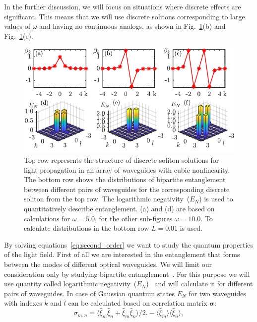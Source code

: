 \documentclass[9pt,twocolumn,twoside]{osajnl}
\begin{document}
In the further discussion, we will focus on situations where discrete effects are significant. 
This means that we will use discrete solitons corresponding to large values of $\omega$ and having no continuous analogs, as shown in Fig.~\ref{fig:structure}(b) and Fig.~\ref{fig:structure}(c).
\par
\begin{figure}[h!]
	\centering\includegraphics{fig2}
	\caption{Top row represents the structure of discrete soliton solutions for light propagation in an array of waveguides with cubic nonlinearity. The bottom row shows the distributions of bipartite entanglement between different pairs of waveguides for the corresponding discrete soliton from the top row. The logarithmic negativity~($E_N$) is used to quantitatively describe entanglement. (a) and (d) are based on calculations for $\omega = 5.0$, for the other sub-figures $\omega = 10.0$. To calculate distributions in the bottom row $L=0.01$ is used.}
	\label{fig:structure}
\end{figure}
By solving equations~\eqref{eq:second_order} we want to study the quantum properties of the light field.
First of all we are interested in the entanglement that forms between the modes of different optical waveguides.
We will limit our consideration only by studying bipartite entanglement~\cite{gebremariam_tesfahannes_generation_2020, tura_detecting_2014}.
For this purpose we will use quantity called logarithmic negativity~($E_N$)~\cite{vidal_computable_2002} and will calculate it for different pairs of waveguides. 
In case of Gaussian quantum states $E_N$ for two waveguides with indexes $k$ and $l$ can be calculated based on correlation matrix $\bm{\sigma}$:
\begin{equation}\label{eq:cov_matr}
	\sigma_{m,n}=\langle\hat{\xi}_{m}\hat{\xi}_{n}+\hat{\xi}_{m}\hat{\xi}_{n}\rangle\bigl/2\bigr.-\langle\hat{\xi}_{m}\rangle\langle\hat{\xi}_{n}\rangle,    
\end{equation}
\end{document}
